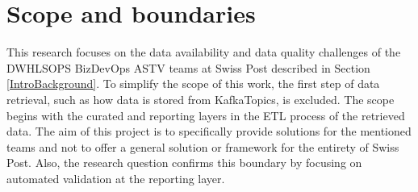 

\section{Scope and boundaries}

This research focuses on the data availability and data quality challenges of the \gls{DWHLSOPS} \gls{BizDevOps} \gls{ASTV} teams at Swiss Post described in Section \ref{IntroBackground}. To simplify the scope of this work, the first step of data retrieval, such as how data is stored from \gls{KafkaTopics}, is excluded. The scope begins with the curated and reporting layers in the \gls{ETL} process of the retrieved data. The aim of this project is to specifically provide solutions for the mentioned teams and not to offer a general solution or framework for the entirety of Swiss Post. Also, the research question confirms this boundary by focusing on automated validation at the reporting layer.

